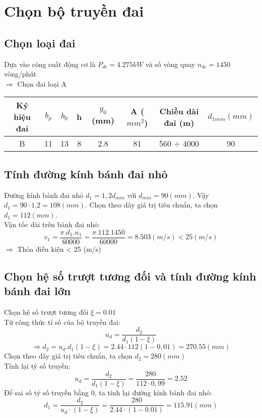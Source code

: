 \section{Chọn bộ truyền đai}
\subsection{Chọn loại đai}
Dựa vào công suất động cơ là $P_{dc} = 4.275 kW$ và số vòng quay $n_{dc} = 1450$ vòng/phút \\
$\Rightarrow$ Chọn đai loại A \\    

\begin{tabular}{|c|c|c|c|c|c|c|c|}
    \hline 
    Ký hiệu đai & $b_p$  & $b_0$  & h  & $y_0$ (mm) & A ($mm^2$) & Chiều dài đai (m) & $d_{1min} (mm)$ \\ \hline
    B & 11 & 13 & 8 & 2.8 & 81 & 560 $\div$ 4000 & 90 \\ \hline
\end{tabular}
\subsection{Tính đường kính bánh đai nhỏ}
Đường kính bánh đai nhỏ $d_1 = 1,2d_{min}$ với $d_{min} = 90 (mm)$. Vậy $d_1 = 90 \cdot 1.2=108(mm)$.
Chọn theo dãy giá trị tiêu chuẩn, ta chọn $d_1 = 112 (mm)$.\\
Vận tốc dài trên bánh đai nhỏ:\\
\[
    v_1 = \frac{\pi.d_1.n_1}{60000} = \frac{\pi.112.1450}{60000} = 8.503 (m/s) < 25 (m/s)
\]  
$\Rightarrow$ Thỏa điều kiện < 25 (m/s) \\
\subsection{Chọn hệ số trượt tương đối và tính đường kính bánh đai lớn}
Chọn hệ số trượt tương đối $\xi = 0.01$ \\
Từ công thức tỉ số của bộ truyền đai: \\
\[
    u_d = \frac{d_2}{d_1(1 - \xi)}
\]
\[
    \Rightarrow d_2 = u_d.d_1(1 - \xi) = 2.44 \cdot 112(1 - 0,01) = 270.55 (mm)
\]
Chọn theo dãy giá trị tiêu chuẩn, ta chọn $d_2 = 280 (mm)$ \\
Tính lại tỷ số truyền: \\
\[
    u_d = \frac{d_2}{d_1(1 - \xi)} = \frac{280}{112 \cdot 0,99} = 2.52
\]
Để sai số tỷ số truyền bằng 0, ta tính lại đường kính bánh đai nhỏ: \\
\[
    d_1 = \frac{d_2}{u_d \cdot (1- \xi)} = \frac{280}{2.44 \cdot (1-0.01)} = 115.91 (mm)
\]
